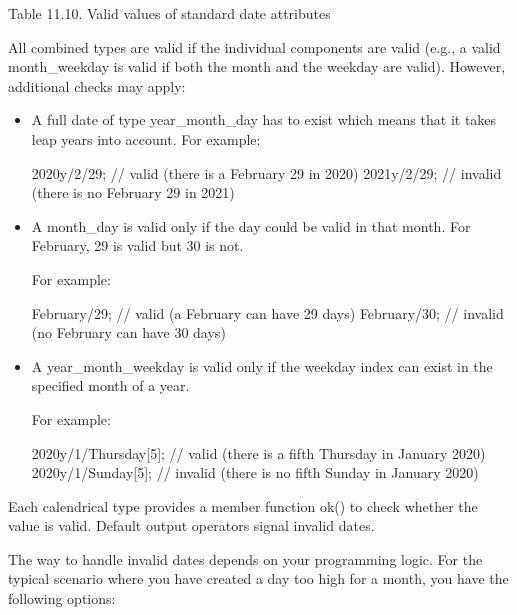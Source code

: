 \begin{center}
Table 11.10. Valid values of standard date attributes
\end{center}

All combined types are valid if the individual components are valid (e.g., a valid month\_weekday is valid if both the month and the weekday are valid). However, additional checks may apply:

\begin{itemize}
\item 
A full date of type year\_month\_day has to exist which means that it takes leap years into account. For example:

\begin{cpp}
2020y/2/29; // valid (there is a February 29 in 2020)
2021y/2/29; // invalid (there is no February 29 in 2021)
\end{cpp}

\item 
A month\_day is valid only if the day could be valid in that month. For February, 29 is valid but 30 is not.

For example:

\begin{cpp}
February/29; // valid (a February can have 29 days)
February/30; // invalid (no February can have 30 days)
\end{cpp}

\item 
A year\_month\_weekday is valid only if the weekday index can exist in the specified month of a year.

For example:

\begin{cpp}
2020y/1/Thursday[5]; // valid (there is a fifth Thursday in January 2020)
2020y/1/Sunday[5]; // invalid (there is no fifth Sunday in January 2020)
\end{cpp}
\end{itemize}

Each calendrical type provides a member function ok() to check whether the value is valid. Default output operators signal invalid dates.

The way to handle invalid dates depends on your programming logic. For the typical scenario where you have created a day too high for a month, you have the following options:

